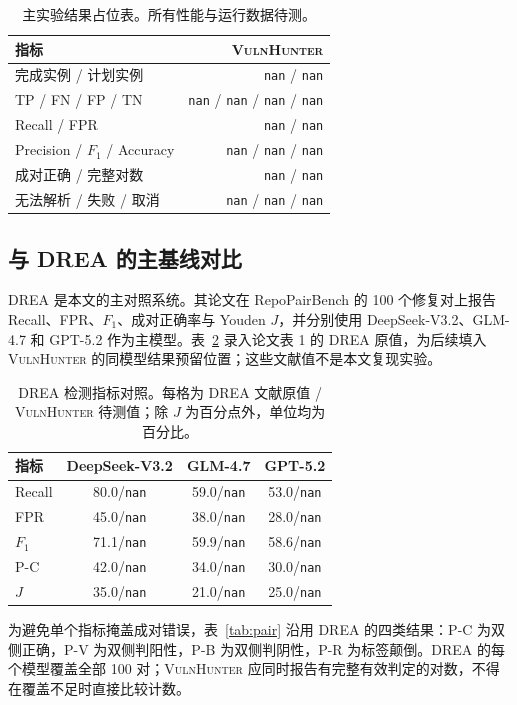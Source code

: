 \documentclass[times,twoside,watermark]{zHenriquesLab-StyleBioRxiv}
\newcommand{\VH}{\textsc{VulnHunter}}
\newcommand{\nan}{\texttt{nan}}
\begin{document}
\begin{table}[H]
\centering
\caption{主实验结果占位表。所有性能与运行数据待测。}
\label{tab:main}
\begin{tabular}{lr}
\toprule
指标 & \VH{}\\
\midrule
完成实例 / 计划实例 & \nan{} / \nan{}\\
TP / FN / FP / TN & \nan{} / \nan{} / \nan{} / \nan{}\\
Recall / FPR & \nan{} / \nan{}\\
Precision / $F_1$ / Accuracy & \nan{} / \nan{} / \nan{}\\
成对正确 / 完整对数 & \nan{} / \nan{}\\
无法解析 / 失败 / 取消 & \nan{} / \nan{} / \nan{}\\
\bottomrule
\end{tabular}
\end{table}

\subsection*{与 DREA 的主基线对比}
DREA 是本文的主对照系统。其论文在 RepoPairBench 的 100 个修复对上报告 Recall、FPR、$F_1$、成对正确率与 Youden $J$，并分别使用 DeepSeek-V3.2、GLM-4.7 和 GPT-5.2 作为主模型\cite{drea2026}。表~\ref{tab:drea} 录入论文表 1 的 DREA 原值，为后续填入 \VH{} 的同模型结果预留位置；这些文献值不是本文复现实验。

\begin{table}[H]
\centering\footnotesize
\caption{DREA 检测指标对照。每格为 DREA 文献原值 / \VH{} 待测值；除 $J$ 为百分点外，单位均为百分比。}
\label{tab:drea}
\begin{tabular}{lccc}
\toprule
指标 & DeepSeek-V3.2 & GLM-4.7 & GPT-5.2\\
\midrule
Recall & 80.0/\nan{} & 59.0/\nan{} & 53.0/\nan{}\\
FPR & 45.0/\nan{} & 38.0/\nan{} & 28.0/\nan{}\\
$F_1$ & 71.1/\nan{} & 59.9/\nan{} & 58.6/\nan{}\\
P-C & 42.0/\nan{} & 34.0/\nan{} & 30.0/\nan{}\\
$J$ & 35.0/\nan{} & 21.0/\nan{} & 25.0/\nan{}\\
\bottomrule
\end{tabular}
\end{table}

为避免单个指标掩盖成对错误，表~\ref{tab:pair} 沿用 DREA 的四类结果：P-C 为双侧正确，P-V 为双侧判阳性，P-B 为双侧判阴性，P-R 为标签颠倒。DREA 的每个模型覆盖全部 100 对；\VH{} 应同时报告有完整有效判定的对数，不得在覆盖不足时直接比较计数。
\end{document}
